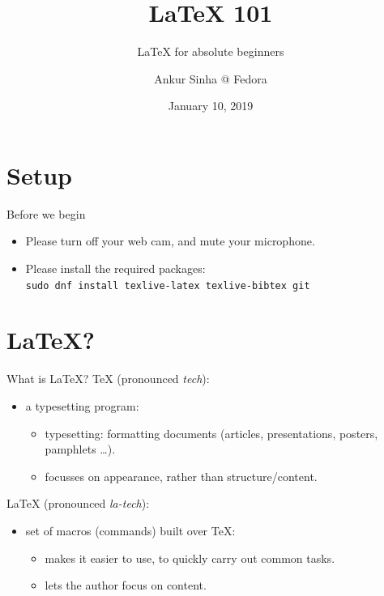 \documentclass[usenames,dvipsnames]{beamer}
\title[\LaTeX{}]{\LaTeX{} 101}
\subtitle{\LaTeX{} for absolute beginners}
\author[ankursinha: FranciscoD]{Ankur Sinha @ Fedora}
\date{January 10, 2019}
\begin{document}
\begin{frame}
  \titlepage{}
\end{frame}

\section{Setup}
\begin{frame}[c]{Before we begin}
  \begin{itemize}
    \item Please turn off your web cam, and mute your microphone.
    \item Please install the required packages:\\ \texttt{sudo dnf install texlive-latex texlive-bibtex git}
  \end{itemize}
\end{frame}
\section{\LaTeX{}?}
\begin{frame}[c]{What is \LaTeX{}?}
  \TeX{} (pronounced \emph{tech})\footnotemark:
  \begin{itemize}
    \item a \alert{typesetting} program:
      \begin{itemize}
        \item typesetting: formatting documents (articles, presentations, posters, pamphlets \ldots).
        \item focusses on appearance, rather than structure/content.
      \end{itemize}
  \end{itemize}
  \pause{}
  \LaTeX{} (pronounced \emph{la-tech})\footnotemark:
  \begin{itemize}
    \item set of \alert{macros} (commands) built over \TeX{}:
      \begin{itemize}
        \item makes it easier to use, to quickly carry out common tasks.
        \item lets the author focus on content.
      \end{itemize}
  \end{itemize}
\end{frame}
\end{document}
